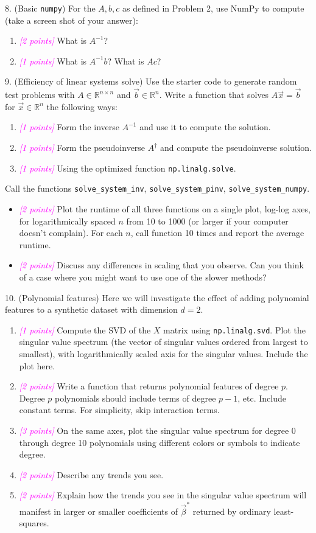 \documentclass{article}
\newcommand{\R}{\mathbb{R}} %
\newcommand{\points}[1]{\small\textcolor{magenta}{\emph{[#1 points]}} \normalsize}
\begin{document}
\vspace{1em}
8. (Basic {\tt numpy}) For the $A, b, c$ as defined in Problem 2, use
NumPy to compute (take a screen shot of your answer):
\begin{enumerate}
\item \points{2} What is $A^{-1}$?
\item \points{1} What is $A^{-1}b$? What is $Ac$?
\end{enumerate}

9. (Efficiency of linear systems solve)
Use the starter code to generate random test problems
with $A \in \R^{n \times n}$ and $\vec b \in \R^{n}$.
Write a function that solves $A \vec x = \vec b$ for $\vec x \in \R^n$
the following ways:
\begin{enumerate}
\item \points{1} Form the inverse $A^{-1}$ and use it to compute the solution.
\item \points{1} Form the pseudoinverse $A^\dagger$ and compute the pseudoinverse solution.
\item \points{1} Using the optimized function {\tt np.linalg.solve}.
\end{enumerate}
Call the functions {\tt solve\_system\_inv}, {\tt solve\_system\_pinv}, {\tt solve\_system\_numpy}.
\begin{itemize}
\item \points{2} Plot the runtime of all three functions
  on a single plot, log-log axes, for logarithmically spaced
  $n$ from 10 to 1000 (or larger if your computer doesn't complain). 
  For each $n$, call function 10 times and report the average runtime.
\item \points{2} Discuss any differences in scaling that you observe.
Can you think of a case where you might want to use one of the slower methods?
\end{itemize}

10. (Polynomial features)
Here we will investigate the effect of adding polynomial features to a synthetic dataset 
with dimension $d=2$.
\begin{enumerate}
\item \points{1} Compute the SVD of the $X$ matrix using {\tt np.linalg.svd}. 
  Plot the singular value spectrum (the vector of singular values ordered from largest to smallest),
  with logarithmically scaled axis for the singular values. Include the plot here.
\item \points{2} Write a function that returns polynomial features of degree $p$.
  Degree $p$ polynomials should include terms of degree $p-1$, etc.
  Include constant terms.
  For simplicity, skip interaction terms.
\item \points{3} On the same axes, plot the singular value spectrum for degree 0 through degree 10 polynomials
  using different colors or symbols to indicate degree.
\item \points{2} Describe any trends you see. 
\item \points{2} Explain how the trends you see in the singular value spectrum will manifest
  in larger or smaller coefficients of $\vec \beta^*$ returned by ordinary least-squares.
\end{enumerate}
\end{document}
